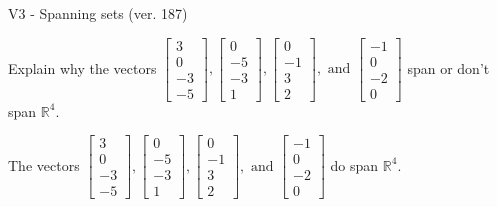 \begin{exercise}
  \begin{exerciseTitle}V3 - Spanning sets (ver. 187)\end{exerciseTitle}
  \begin{exerciseStatement}
    Explain why the vectors \(\left[\begin{array}{r}
3 \\
0 \\
-3 \\
-5
\end{array}\right] , \left[\begin{array}{r}
0 \\
-5 \\
-3 \\
1
\end{array}\right] , \left[\begin{array}{r}
0 \\
-1 \\
3 \\
2
\end{array}\right] , \text{ and } \left[\begin{array}{r}
-1 \\
0 \\
-2 \\
0
\end{array}\right]\) span or don't span \(\mathbb{R}^4\). 
	


  \end{exerciseStatement}
  \begin{exerciseAnswer}
   The vectors \(\left[\begin{array}{r}
3 \\
0 \\
-3 \\
-5
\end{array}\right] , \left[\begin{array}{r}
0 \\
-5 \\
-3 \\
1
\end{array}\right] , \left[\begin{array}{r}
0 \\
-1 \\
3 \\
2
\end{array}\right] , \text{ and } \left[\begin{array}{r}
-1 \\
0 \\
-2 \\
0
\end{array}\right]\) 
  	 do  
	span \(\mathbb{R}^4\).
  


  \end{exerciseAnswer}
\end{exercise}
